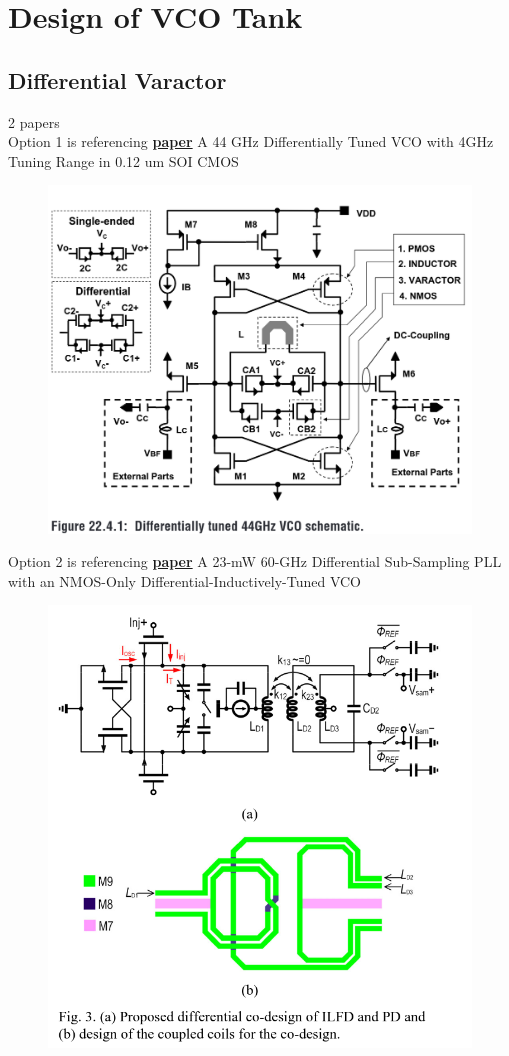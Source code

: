 \documentclass{article}
\begin{document}

\section{Design of VCO Tank}


\subsection{Differential Varactor}
%
2 papers \\

Option 1 is referencing \href{https://ieeexplore.ieee.org/document/1494046?arnumber=1494046}{\textbf{paper}} A 44 \unit{GHz} Differentially Tuned VCO with 4GHz Tuning Range in 0.12 \unit{um} SOI CMOS


\begin{figure}[ht!]
	\includegraphics[width=0.5\linewidth]{Figures/diff-var1.png}
	\label{fig:diff-var1}
\end{figure}

Option 2 is referencing \href{https://ieeexplore.ieee.org/document/9056968}{\textbf{paper}} A 23-mW 60-GHz Differential Sub-Sampling PLL with an NMOS-Only Differential-Inductively-Tuned VCO
\begin{figure}[ht!]
	\includegraphics[width=0.5\linewidth]{Figures/diff-var2.png}
	\label{fig:diff-var2}
\end{figure}
\end{document}
